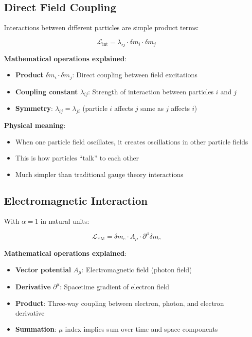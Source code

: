 \documentclass[12pt,a4paper]{article}
\newcommand{\deltam}{\delta m}
\newcommand{\Lag}{\mathcal{L}}
\theoremstyle{definition}
\theoremstyle{remark}
\begin{document}
	\subsection{Direct Field Coupling}
	
	Interactions between different particles are simple product terms:
	
	\begin{equation}
		\Lag_{\text{int}} = \lambda_{ij} \cdot \deltam_i \cdot \deltam_j
		\label{eq:interaction_lagrangian}
	\end{equation}
	
	\textbf{Mathematical operations explained}:
	\begin{itemize}
		\item \textbf{Product} $\deltam_i \cdot \deltam_j$: Direct coupling between field excitations
		\item \textbf{Coupling constant} $\lambda_{ij}$: Strength of interaction between particles $i$ and $j$
		\item \textbf{Symmetry}: $\lambda_{ij} = \lambda_{ji}$ (particle $i$ affects $j$ same as $j$ affects $i$)
	\end{itemize}
	
	\textbf{Physical meaning}:
	\begin{itemize}
		\item When one particle field oscillates, it creates oscillations in other particle fields
		\item This is how particles ``talk'' to each other
		\item Much simpler than traditional gauge theory interactions
	\end{itemize}
	
	\subsection{Electromagnetic Interaction}
	
	With $\alpha = 1$ in natural units:
	
	\begin{equation}
		\Lag_{\text{EM}} = \deltam_e \cdot A_\mu \cdot \partial^\mu \deltam_e
		\label{eq:em_interaction}
	\end{equation}
	
	\textbf{Mathematical operations explained}:
	\begin{itemize}
		\item \textbf{Vector potential} $A_\mu$: Electromagnetic field (photon field)
		\item \textbf{Derivative} $\partial^\mu$: Spacetime gradient of electron field
		\item \textbf{Product}: Three-way coupling between electron, photon, and electron derivative
		\item \textbf{Summation}: $\mu$ index implies sum over time and space components
	\end{itemize}
	
\end{document}
